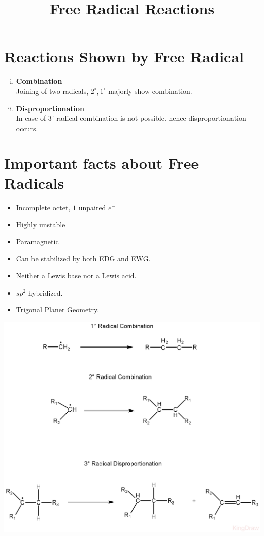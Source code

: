 \documentclass{article}
\title{Free Radical Reactions}
\author{}
\date{}
\begin{document}
\maketitle

\section{Reactions Shown by Free Radical}
\begin{enumerate}[i.]
    \item \textbf{Combination} \\
          Joining of two radicals, $2^\circ, 1^\circ$ majorly show combination.
    \item \textbf{Disproportionation} \\
          In case of $3^\circ$ radical combination is not possible, hence disproportionation occurs.
\end{enumerate}

\section{Important facts about Free Radicals}
\begin{itemize}
    \item Incomplete octet, $1$ unpaired $e^-$
    \item Highly unstable
    \item Paramagnetic
    \item Can be stabilized by both EDG and EWG.
    \item Neither a Lewis base nor a Lewis acid.
    \item $sp^2$ hybridized.
    \item Trigonal Planer Geometry.
\end{itemize}
\pagebreak
\begin{center} 
    \includegraphics[scale=0.3]{FreeRadicalReaction(1)_1722161083701.JPEG}
\end{center}
\end{document}

